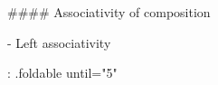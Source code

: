 #### Associativity of composition

- Left associativity

{: .foldable until="5" }
\begin{code}%
\>[0]\<%
\\
\>[0][@{}l@{\AgdaIndent{0}}]%
\>[2]\AgdaSymbol{:}\AgdaSpace{}%
\AgdaSpace{}%
\AgdaSymbol{\{}\AgdaSymbol{\}}\AgdaSpace{}%
\AgdaSymbol{\{}\AgdaSpace{}%
\AgdaSpace{}%
\AgdaSpace{}%
\AgdaSpace{}%
\AgdaSymbol{:}\AgdaSpace{}%
\AgdaSpace{}%
\AgdaSymbol{\}}\<%
\\
%
\>[2]\AgdaSpace{}%
\AgdaSymbol{(}\AgdaSpace{}%
\AgdaSymbol{:}\AgdaSpace{}%
\AgdaSpace{}%
\AgdaSpace{}%
\AgdaSymbol{)}\AgdaSpace{}%
\AgdaSpace{}%
\AgdaSymbol{(}\AgdaSpace{}%
\AgdaSymbol{:}\AgdaSpace{}%
\AgdaSpace{}%
\AgdaSpace{}%
\AgdaSymbol{)}\AgdaSpace{}%
\AgdaSpace{}%
\AgdaSymbol{(}\AgdaSpace{}%
\AgdaSymbol{:}\AgdaSpace{}%
\AgdaSpace{}%
\AgdaSpace{}%
\AgdaSymbol{)}\<%
\\
%
\>[2]\AgdaComment{-----------------------------------------}\<%
\\
%
\>[2]\AgdaSpace{}%
\AgdaSymbol{(}\AgdaSpace{}%
\AgdaSpace{}%
\AgdaSymbol{(}\AgdaSpace{}%
\AgdaSpace{}%
\AgdaSymbol{))}\AgdaSpace{}%
\AgdaOperator{\AgdaDatatype{==}}\AgdaSpace{}%
\AgdaSymbol{((}\AgdaSpace{}%
\AgdaSpace{}%
\AgdaSymbol{)}\AgdaSpace{}%
\AgdaSpace{}%
\AgdaSymbol{)}\<%
\\
%
\\[\AgdaEmptyExtraSkip]%
\>[0]\AgdaSpace{}%
\AgdaSpace{}%
\AgdaSpace{}%
\AgdaSpace{}%
\AgdaSymbol{=}\AgdaSpace{}%
\AgdaSpace{}%
\AgdaSymbol{\{}\AgdaSpace{}%
\AgdaSymbol{=}\AgdaSpace{}%
\AgdaSpace{}%
\AgdaSpace{}%
\AgdaSpace{}%
\AgdaSpace{}%
\AgdaSymbol{(}\AgdaSpace{}%
\AgdaSymbol{(}\AgdaSpace{}%
\AgdaSymbol{)))\}}\<%
\end{code}


